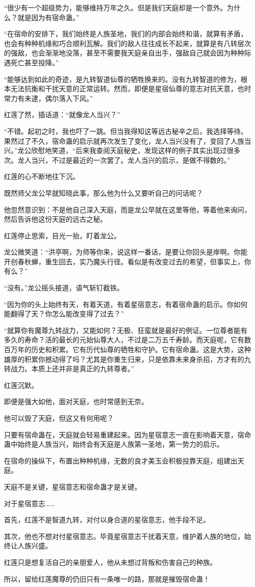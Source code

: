 \begin{this_body}
“很少有一个超级势力，能够维持万年之久。但是我们天庭却是一个意外。为什么？就是因为有宿命蛊。”

“在宿命的安排下，我们始终是人族圣地，我们的内部会始终和谐，就算有矛盾，也会有种种机缘和巧合顺利瓦解。我们的敌人往往成长不起来，就算是有八转层次的强敌，也会渐渐地没落，甚至不需要我天庭亲自出手，强敌自己就会因为种种际遇死亡甚至投降。”

“能够达到如此的奇迹，是九转智道仙尊的牺牲换来的。没有九转智道的修为，根本无法抗衡和干扰天意的正常运转。然而，即便是星宿仙尊的意志对抗天意，也时常力有未逮，偶尔落入下风。”

红莲了然，插话道：“就像龙人当兴？”

“不错。起初之时，我也吓了一跳。但当我得知这等远古秘辛之后，我选择等待。果然过了不久，宿命蛊的启示就再次发生了变化，龙人当兴没有了，变回了人族当兴。”龙公欣慰地笑道，“后来我查阅天庭秘史，发现这样的例子其实出现过很多次。龙人当兴，不过是最近的一次罢了。龙人当兴的启示，是做不得数的。”

红莲的心不断地往下沉。

既然师父龙公早就知晓此事，那么他为什么又要听自己的问话呢？

他忽然意识到：不是他自己深入天庭，而是龙公早就在这里等他，等着他来询问，然后告诉他这份天庭的远古之秘。

红莲停止思索，目光一抬，盯着龙公。

龙公微笑道：“洪亭啊，为师等你来，说这样一番话，是要让你回头是岸啊。你能开创春秋蝉，重生回去，实乃魔头行径。看似是有改变过去的希望，但事实上，你有么？”

“没有。”龙公摇头接道，语气斩钉截铁。

“因为你的头上始终有天，有着天道，有着星宿意志，有着宿命蛊的启示。你如何能翻得了天？你怎么能改变得了过去？”

“就算你有魔尊九转战力，又能如何？无极、狂蛮就是最好的例证。一位尊者能有多久的寿命？活的最长的元始仙尊大人，不过是二万五千寿龄。而天庭呢，它有数百万年的历史和积累。它有历代仙尊的牺牲和守护。它有宿命蛊。这是大势，这种雄厚的积累你撼动得了吗？尤其是你重生归来，只是依靠未来身杀招，方才有的九转战力。本质上还并非是真正的九转尊者。”

红莲沉默。

即便是强大如他，面对天庭，也时常感到无奈。

他可以毁了天庭，但这又有何用呢？

只要有宿命蛊在，天庭就会轻易重建起来。因为星宿意志一直在影响着天意，宿命蛊中始终是人族当兴，始终会有天庭是人族第一圣地，第一势力的启示。

在宿命的操纵下，布置出种种机缘，无数的良才美玉会积极投靠天庭，组建出天庭。

天庭不是关键，星宿意志和宿命蛊才是关键。

对于星宿意志……

首先，红莲不是智道九转，对付以身合道的星宿意志，他手段不足。

其次，他也不想对付星宿意志。毕竟星宿意志干扰着天意，维护着人族的地位，始终让人族兴盛。

红莲只是想复活自己的亲朋爱人，他从未想过背叛和伤害自己的种族。

所以，留给红莲魔尊的仍旧只有一条唯一的路，那就是摧毁宿命蛊！

\end{this_body}

